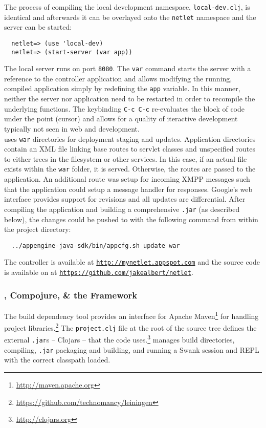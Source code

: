 The process of compiling the local development namespace, \texttt{local-dev.clj}, is identical and afterwards it can be overlayed onto the \texttt{netlet} namespace and the server can be started:
\begin{lstlisting}
  netlet=> (use 'local-dev)
  netlet=> (start-server (var app))
\end{lstlisting}
\vspace{2mm}
The local server runs on port \texttt{8080}.  The \texttt{var} command starts the server with a reference to the \netlet controller application and allows modifying the running, compiled application simply by redefining the \texttt{app} variable.  In this manner, neither the server nor application need to be restarted in order to recompile the underlying functions.  The \emacs keybinding \texttt{C-c C-c} re-evaluates the block of code under the point (cursor) and allows for a quality of iteractive development typically not seen in web and \java development.\\

\gae uses \texttt{war} directories for deployment staging and updates.  Application directories contain an XML file linking base routes to servlet classes and unspecified routes to either trees in the filesystem or other services.  In this case, if an actual file exists within the \texttt{war} folder, it is served.  Otherwise, the routes are passed to the \netlets \clojure application.  An additional route was setup for incoming XMPP messages such that the \clojure application could setup a message handler for responses. Google's web interface provides support for revisions and all updates are differential.  After compiling the \clojure application and building a comprehensive \texttt{.jar} (as described below), the changes could be pushed to \aengn with the following command from within the \netlets project directory:
\begin{lstlisting}
  ../appengine-java-sdk/bin/appcfg.sh update war
\end{lstlisting}
\vspace{2mm}
The \aengn \netlet controller is available at \texttt{\url{http://mynetlet.appspot.com}} and the source code is available on \github at \texttt{\url{https://github.com/jakealbert/netlet}}.\\

\subsubsection{\lein, Compojure, \& the \cljybh Framework}
The \lein build dependency tool provides an interface for Apache Maven\footnote{\url{http://maven.apache.org}} for handling \clojure project libraries.\footnote{\url{https://github.com/technomancy/leiningen}}  The \texttt{project.clj} file at the root of the source tree defines the external \texttt{.jar}s -- Clojars -- that the \netlet code uses.\footnote{\url{http://clojars.org}}  \lein manages build directories, compiling, \texttt{.jar} packaging and building, and running a Swank session and REPL with the correct classpath loaded.\\

